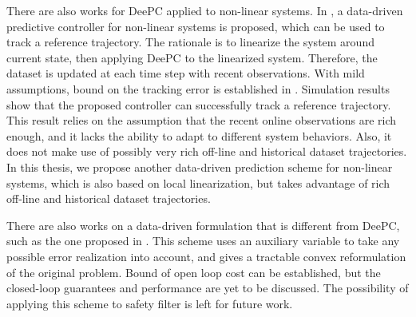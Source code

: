 There are also works for DeePC applied to non-linear systems.
In \cite{berberichLinearTrackingMPCData2022}, a data-driven predictive controller for non-linear systems is proposed, which can be used to track a reference trajectory.
The rationale is to linearize the system around current state, then applying DeePC to the linearized system.
Therefore, the dataset is updated at each time step with recent observations.
With mild assumptions, bound on the tracking error is established in \cite{berberichLinearTrackingMPCData2022}.
Simulation results show that the proposed controller can successfully track a reference trajectory.
This result relies on the assumption that the recent online observations are rich enough, and it lacks the ability to adapt to different system behaviors.
Also, it does not make use of possibly very rich off-line and historical dataset trajectories.
In this thesis, we propose another data-driven prediction scheme for non-linear systems, which is also based on local linearization, but takes advantage of rich off-line and historical dataset trajectories.

There are also works on a data-driven formulation that is different from DeePC, such as the one proposed in \cite{huangRobustDataEnabledPredictive2023}.
This scheme uses an auxiliary variable to take any possible error realization into account, and gives a tractable convex reformulation of the original problem.
Bound of open loop cost can be established, but the closed-loop guarantees and performance are yet to be discussed.
The possibility of applying this scheme to safety filter is left for future work.

